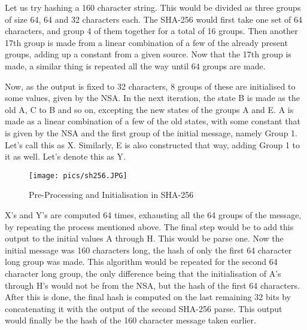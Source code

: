 \documentclass[12pt,a4paper]{report}
\begin{document}
\begin{flushleft}
\vspace{10mm}

Let us try hashing a 160 character string. This would be divided as three groups of size 64, 64 and 32 characters each. The SHA-256 would first take one set of 64 characters, and group 4 of them together for a total of 16 groups. Then another 17th group is made from a linear combination of a few of the already present groups, adding up a constant from a given source. Now that the 17th group is made, a similar thing is repeated all the way until 64 groups are made. \newline

\vspace{10mm}

Now, as the output is fixed to 32 characters, 8 groups of these are initialised to some values, given by the NSA. In the next iteration, the state B is made as the old A, C to B and so on, excepting the new states of the groups A and E. A is made as a linear combination of a few of the old states, with some constant that is given by the NSA and the first group of the initial message, namely Group 1. Let's call this as X. Similarly, E is also constructed that way, adding Group 1 to it as well. Let's denote this as Y. \newline

\vspace{10mm}
\begin{figure}[h]
\centering
\caption{Pre-Processing and Initialisation in SHA-256}
\texttt{[image: pics/sh256.JPG]}
\end{figure}
\vspace{10mm}



X's and Y's are computed 64 times, exhausting all the 64 groups of the message, by repeating the process mentioned above. The final step would be to add this output to the initial values A through H. This would be parse one.\newline
Now the initial message was 160 characters long, the hash of only the first 64 character long group was made. This algorithm would be repeated for the second 64 character long group, the only difference being that the initialisation of A's through H's would not be from the NSA, but the hash of the first 64 characters. After this is done, the final hash is computed on the last remaining 32 bits by concatenating it with the output of the second SHA-256 parse.\newline
This output would finally be the hash of the 160 character message taken earlier. 


\end{flushleft}
\end{document}

